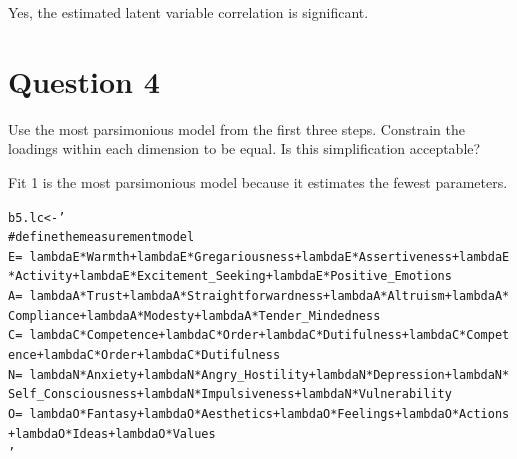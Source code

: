 \documentclass{article}\usepackage[]{graphicx}\usepackage[]{color}
\makeatletter
\newcommand{\hlstr}[1]{\textcolor[rgb]{0.192,0.494,0.8}{#1}}%
\newcommand{\hlstd}[1]{\textcolor[rgb]{0.345,0.345,0.345}{#1}}%
\newcommand{\hlkwb}[1]{\textcolor[rgb]{0.69,0.353,0.396}{#1}}%
\newenvironment{kframe}{%
 \def\at@end@of@kframe{}%
 \ifinner\ifhmode%
  \def\at@end@of@kframe{\end{minipage}}%
  \begin{minipage}{\columnwidth}%
 \fi\fi%
 \def\FrameCommand##1{\hskip\@totalleftmargin \hskip-\fboxsep
 \colorbox{shadecolor}{##1}\hskip-\fboxsep
     \hskip-\linewidth \hskip-\@totalleftmargin \hskip\columnwidth}%
 \MakeFramed {\advance\hsize-\width
   \@totalleftmargin\z@ \linewidth\hsize
   \@setminipage}}%
 {\par\unskip\endMakeFramed%
 \at@end@of@kframe}
\newenvironment{knitrout}{}{} %
\makeatother
\begin{document}
Yes, the estimated latent variable correlation is significant. 

\section{Question 4}
Use the most parsimonious model from the first three steps. Constrain the loadings within each dimension to be equal. Is this simplification acceptable?  

Fit 1 is the most parsimonious model because it estimates the fewest parameters.  

\begin{knitrout}
\color{fgcolor}\begin{kframe}
\begin{alltt}
\hlstd{b5.lc} \hlkwb{<-} \hlstr{'
# define the measurement model
E =~ lambdaE*Warmth + lambdaE*Gregariousness + lambdaE*Assertiveness + lambdaE*Activity + lambdaE*Excitement_Seeking + lambdaE*Positive_Emotions
A =~ lambdaA*Trust + lambdaA*Straightforwardness + lambdaA*Altruism + lambdaA*Compliance + lambdaA*Modesty + lambdaA*Tender_Mindedness
C =~ lambdaC*Competence + lambdaC*Order + lambdaC*Dutifulness + lambdaC*Competence + lambdaC*Order + lambdaC*Dutifulness
N =~ lambdaN*Anxiety + lambdaN*Angry_Hostility + lambdaN*Depression + lambdaN*Self_Consciousness + lambdaN*Impulsiveness + lambdaN*Vulnerability
O =~ lambdaO*Fantasy + lambdaO*Aesthetics + lambdaO*Feelings + lambdaO*Actions + lambdaO*Ideas + lambdaO*Values
'}


\end{alltt}
\end{kframe}
\end{knitrout}
\end{document}
